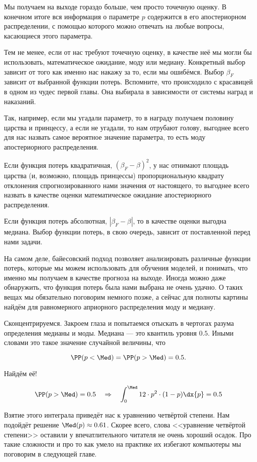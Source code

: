 Мы получаем на выходе гораздо больше, чем просто точечную оценку. В конечном итоге вся информация о параметре $p$ содержится в его апостериорном распределении, с помощью которого можно отвечать на любые вопросы, касающиеся этого параметра. 

Тем не менее, если от нас требуют точечную оценку, в качестве неё мы могли бы использовать, математическое ожидание, моду или медиану. Конкретный выбор зависит от того как именно нас накажу за то, если мы ошибёмся. Выбор $\beta_F$ зависит от выбранной функции потерь. Вспомните, что происходило с красавицей в одном из чудес первой главы. Она выбирала в зависимости от системы наград и наказаний. 

Так, например, если мы угадали параметр, то в награду получаем половину царства и принцессу, а если не угадали, то нам отрубают голову, выгоднее всего для нас назвать самое вероятное значение параметра, то есть моду апостериорного распределения. 

Если функция потерь квадратичная, $(\beta_F - \beta)^2$, у нас отнимают площадь царства (и, возможно, площадь принцессы) пропорциональную квадрату отклонения спрогнозированного нами значения от настоящего, то выгоднее всего назвать в качестве оценки математическое ожидание апостериорного распределения.

Если функция потерь абсолютная, $|\beta_F - \beta|$, то в качестве оценки выгодна медиана. Выбор функции потерь, в свою очередь, зависит от поставленной перед нами задачи.

На самом деле, байесовский подход позволяет анализировать различные функции потерь, которые мы можем использовать для обучения моделей, и понимать, что именно мы получаем в качестве прогноза на выходе. Иногда можно даже обнаружить, что функция потерь была нами выбрана не очень удачно. О таких вещах мы обязательно поговорим немного позже, а сейчас для полноты картины найдём для равномерного априорного распределения моду и медиану.

Сконцентрируемся. Закроем глаза и попытаемся отыскать в чертогах разума определения медианы и моды.  Медиана --- это квантиль уровня $0.5$. Иными словами это такое значение случайной величины, что 

\[\PP(p < \Med) = \PP(p > \Med) = 0.5.\]

 Найдём её!

\[ \PP(p > \Med) = 0.5 \quad \Rightarrow \quad \int_0^{\Med} 12 \cdot p^2 \cdot (1-p) \dx{p} = 0.5  \]

Взятие этого интеграла приведёт нас к уравнению четвёртой степени. Нам подойдёт решение $\Med(p) \approx 0.61 $. Скорее всего, слова <<уравнение четвёртой степени>> оставили у впечатлительного  читателя не очень хороший осадок. Про такие сложности и про то как умело на практике их избегают компьютеры мы поговорим в следующей главе. 

